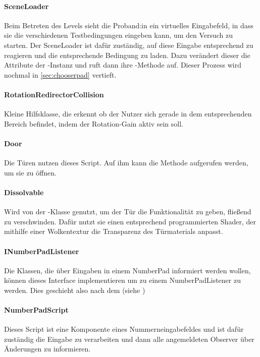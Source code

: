 \begin{multicols*}{2}
    \paragraph{SceneLoader}
    Beim Betreten des Levels sieht die Proband:in ein virtuelles Eingabefeld, in dass sie die verschiedenen Testbedingungen eingeben kann, um den Versuch zu starten. Der SceneLoader ist dafür zuständig, auf diese Eingabe entsprechend zu reagieren und die entsprechende Bedingung zu laden. Dazu verändert dieser die Attribute der -Instanz und ruft dann ihre -Methode auf. Dieser Prozess wird nochmal in \autoref{sec:chooserpad} vertieft.

    \paragraph{RotationRedirectorCollision}
    Kleine Hilfsklasse, die erkennt ob der Nutzer sich gerade in dem entsprechenden Bereich befindet, indem der Rotation-Gain aktiv sein soll.

    \paragraph{Door}
    Die Türen nutzen dieses Script. Auf ihm kann die Methode  aufgerufen werden, um sie zu öffnen.

    \paragraph{Dissolvable}
    Wird von der -Klasse genutzt, um der Tür die Funktionalität zu geben, fließend zu verschwinden. Dafür nutzt sie einen entsprechend programmierten Shader, der mithilfe einer Wolkentextur die Transparenz des Türmaterials anpasst. %

    \paragraph{INumberPadListener}
    Die Klassen, die über Eingaben in einem NumberPad informiert werden wollen, können dieses Interface implementieren um zu einem NumberPadListener zu werden. Dies geschieht also nach dem  (siehe \cite{design-patterns})

    \paragraph{NumberPadScript}
    Dieses Script ist eine Komponente eines Nummerneingabefeldes und ist dafür zuständig die Eingabe zu verarbeiten und dann alle angemeldeten Observer über Änderungen zu informieren.


\end{multicols*}
